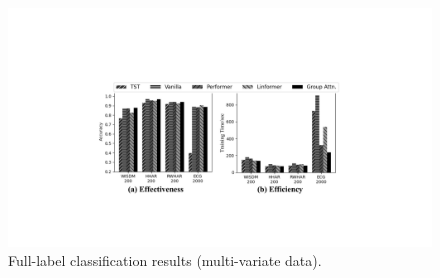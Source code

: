 \begin{figure}[t]
    \centering
    \includegraphics[width=1.0\columnwidth]{figures/cls.pdf}
    \vspace{-6mm}
    \caption{Full-label classification results (multi-variate data).}
    \label{fig.full}
    \vspace{-6mm}
\end{figure}

